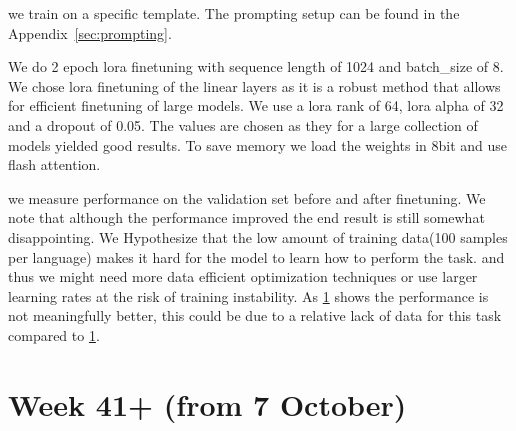\documentclass[11pt]{article}
\begin{document}
we train on a specific template. The prompting setup can be found in the Appendix~\vref{sec:prompting}.

We do 2 epoch lora finetuning \cite{hu2021loralowrankadaptationlarge} with sequence length of 1024 and batch\_size of 8. We chose lora finetuning of the linear layers as it is a robust method that allows for efficient finetuning of large models.
We use a lora rank of 64, lora alpha of 32 and a dropout of 0.05. The values are chosen as they for a large collection of models yielded good results.
To save memory we load the weights in 8bit and use flash attention.

\begin{table}[ht]
    \centering
    \caption{Performance comparison of pre-finetuned and finetuned llama3 8B models}
    \label{fig:llama3_performance_comparison_week40}
\end{table}

we measure performance on the validation set before and after finetuning.
We note that although the performance improved the end result is still somewhat disappointing.
We Hypothesize that the low amount of training data(100 samples per language) makes it hard for the model to learn how to perform the task. 
and thus we might need more data efficient optimization techniques or use larger learning rates at the risk of training instability.
As \ref{sec:week41} shows the performance is not meaningfully better, this could be due to a relative lack of data for this task compared to \ref{sec:week41}.



\section{Week 41+ (from 7 October)}
\label{sec:week41}
\end{document}
